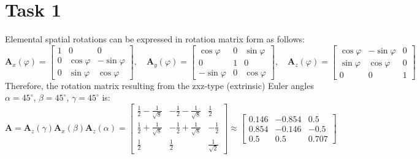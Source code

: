 \documentclass{article}
\begin{document}
\section*{Task 1}
Elemental spatial rotations can be expressed in rotation matrix form as follows:
\begin{equation}
\mathbf{A}_x (\varphi) =
\begin{bmatrix}
	1 & 0 & 0\\
	0 & \cos \varphi & -\sin \varphi \\
	0 & \sin \varphi & \cos \varphi
	\end{bmatrix},
	\quad
	\mathbf{A}_y (\varphi) =
	\begin{bmatrix}
	\cos \varphi & 0 & \sin \varphi\\
	0 & 1 & 0 \\
	-\sin \varphi & 0 & \cos \varphi
	\end{bmatrix},
	\quad
	\mathbf{A}_z (\varphi) =
	\begin{bmatrix}
	\cos \varphi & -\sin \varphi & 0\\
	\sin \varphi & \cos \varphi & 0 \\
	0 & 0 & 1
\end{bmatrix}
\end{equation}
Therefore, the rotation matrix resulting from the zxz-type (extrinsic) Euler angles $\alpha = 45^\circ$, $\beta = 45^\circ$, $\gamma = 45^\circ$ is:
\begin{equation}
\mathbf{A} = \mathbf{A}_z (\gamma) \mathbf{A}_x (\beta) \mathbf{A}_z (\alpha) =
\begin{bmatrix}
	\frac{1}{2} - \frac{1}{\sqrt{8}} & -\frac{1}{2} - \frac{1}{\sqrt{8}} & \frac{1}{2} \\
	\frac{1}{2} + \frac{1}{\sqrt{8}} & -\frac{1}{2} + \frac{1}{\sqrt{8}} & -\frac{1}{2} \\
	\frac{1}{2} & \frac{1}{2} & \frac{1}{\sqrt{2}}
	\end{bmatrix}
	\approx
	\begin{bmatrix}
	0.146 & -0.854 & 0.5 \\
	0.854 & -0.146 & -0.5 \\
	0.5 & 0.5 & 0.707
\end{bmatrix}
\end{equation}
\end{document}
